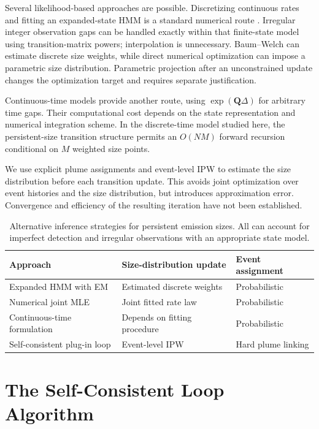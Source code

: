 \documentclass[11pt]{article}
\begin{document}
Several likelihood-based approaches are possible. Discretizing continuous rates and fitting an expanded-state HMM is a standard numerical route \citep{LangrockKing2013}. Irregular integer observation gaps can be handled exactly within that finite-state model using transition-matrix powers; interpolation is unnecessary. Baum--Welch can estimate discrete size weights, while direct numerical optimization can impose a parametric size distribution. Parametric projection after an unconstrained update changes the optimization target and requires separate justification.

Continuous-time models provide another route, using $\exp(\mathbf Q\Delta)$ for arbitrary time gaps. Their computational cost depends on the state representation and numerical integration scheme. In the discrete-time model studied here, the persistent-size transition structure permits an $O(NM)$ forward recursion conditional on $M$ weighted size points.

We use explicit plume assignments and event-level IPW to estimate the size distribution before each transition update. This avoids joint optimization over event histories and the size distribution, but introduces approximation error. Convergence and efficiency of the resulting iteration have not been established.

\begin{table}[h]
\centering
\caption{Alternative inference strategies for persistent emission sizes. All can account for imperfect detection and irregular observations with an appropriate state model.}
\label{tab:comparison}
\begin{tabular}{lll}
\toprule
Approach & Size-distribution update & Event assignment \\
\midrule
Expanded HMM with EM & Estimated discrete weights & Probabilistic \\
Numerical joint MLE & Joint fitted rate law & Probabilistic \\
Continuous-time formulation & Depends on fitting procedure & Probabilistic \\
Self-consistent plug-in loop & Event-level IPW & Hard plume linking \\
\bottomrule
\end{tabular}
\end{table}

\section{The Self-Consistent Loop Algorithm}
\label{sec:algorithm}
\end{document}
